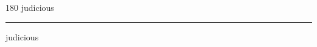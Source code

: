 
\begin{frame}
\begin{center}
\begin{turn}{180}
{\fontsize{2.5cm}{1em}\selectfont judicious}
\end{turn}
\vspace{1em}\par  
\hrule
\vspace{1em}\par  
{\fontsize{2.5cm}{1em}\selectfont judicious}
\end{center}
\end{frame}
